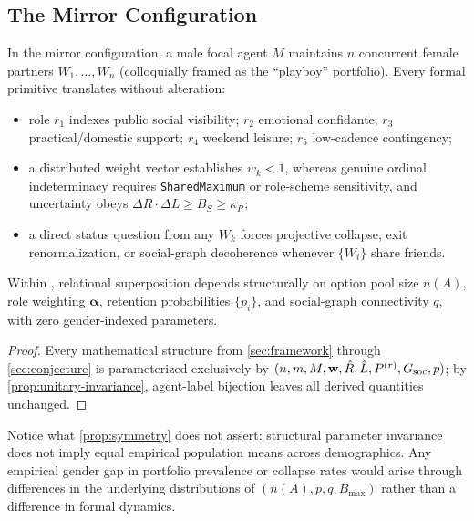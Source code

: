 \subsection{The Mirror Configuration}
\label{subsec:sym-mirror}

\noindent\layerformal{} In the mirror configuration, a male focal agent $M$
maintains $n$ concurrent female partners $W_1, \dots, W_n$ (colloquially framed as the
``playboy'' portfolio). Every formal primitive translates without alteration:
\begin{itemize}[nosep]
  \item role $r_1$ indexes public social visibility; $r_2$ emotional confidante; $r_3$
        practical/domestic support; $r_4$ weekend leisure; $r_5$ low-cadence contingency;
  \item a distributed weight vector establishes $w_k < 1$, whereas genuine ordinal
        indeterminacy requires \textnormal{\texttt{SharedMaximum}} or role-scheme sensitivity,
        and uncertainty obeys $\Delta R \cdot \Delta L \ge B_S \ge \kappa_R$;
  \item a direct status question from any $W_k$ forces projective collapse, exit
        renormalization, or social-graph decoherence whenever $\{W_i\}$ share friends.
\end{itemize}

\begin{proposition}
\label{prop:symmetry}
Within \RST{}, relational superposition depends structurally on option pool size $n(A)$,
role weighting $\boldsymbol{\alpha}$, retention probabilities $\{p_i\}$, and social-graph
connectivity $q$, with zero gender-indexed parameters.
\end{proposition}
\begin{proof}
Every mathematical structure from \cref{sec:framework} through \cref{sec:conjecture} is
parameterized exclusively by $(n, m, M, \mathbf{w}, \hat{R}, \hat{L}, P^{(r)}, G_{\mathrm{soc}}, p)$;
by \cref{prop:unitary-invariance}, agent-label bijection leaves all derived quantities unchanged.
\end{proof}

\begin{remark}
Notice what \cref{prop:symmetry} does not assert: structural parameter invariance does not
imply equal empirical population means across demographics. Any empirical gender gap in
portfolio prevalence or collapse rates would arise through differences in the underlying
distributions of $(n(A), p, q, B_{\max})$ rather than a difference in formal dynamics.
\end{remark}
